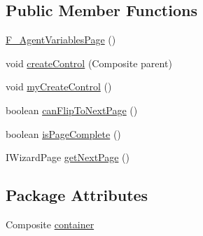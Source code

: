 \subsection*{Public Member Functions}
\begin{DoxyCompactItemize}
\item 
\hyperlink{classit_1_1isislab_1_1masonassisteddocumentation_1_1mason_1_1wizards_1_1_f___agent_variables_page_a59053a7dcc624ebe1cea358cf1b7e23d}{F\-\_\-\-Agent\-Variables\-Page} ()
\item 
void \hyperlink{classit_1_1isislab_1_1masonassisteddocumentation_1_1mason_1_1wizards_1_1_f___agent_variables_page_ac590067eed6481e648b61a6b856b77f6}{create\-Control} (Composite parent)
\item 
void \hyperlink{classit_1_1isislab_1_1masonassisteddocumentation_1_1mason_1_1wizards_1_1_f___agent_variables_page_a275d67efa29411a7afc3ee12531b4f3b}{my\-Create\-Control} ()
\item 
boolean \hyperlink{classit_1_1isislab_1_1masonassisteddocumentation_1_1mason_1_1wizards_1_1_f___agent_variables_page_af307f5819f4e1defe2d02f60fe0d40a2}{can\-Flip\-To\-Next\-Page} ()
\item 
boolean \hyperlink{classit_1_1isislab_1_1masonassisteddocumentation_1_1mason_1_1wizards_1_1_f___agent_variables_page_a7e78f4d835ab6546d4eb0c3bee015c82}{is\-Page\-Complete} ()
\item 
I\-Wizard\-Page \hyperlink{classit_1_1isislab_1_1masonassisteddocumentation_1_1mason_1_1wizards_1_1_f___agent_variables_page_ad80f8e1ea42919b04a60b5e3dd52fd95}{get\-Next\-Page} ()
\end{DoxyCompactItemize}
\subsection*{Package Attributes}
\begin{DoxyCompactItemize}
\item 
Composite \hyperlink{classit_1_1isislab_1_1masonassisteddocumentation_1_1mason_1_1wizards_1_1_f___agent_variables_page_a69defe28748ba6ba72b8c09e3b213245}{container}
\end{DoxyCompactItemize}
